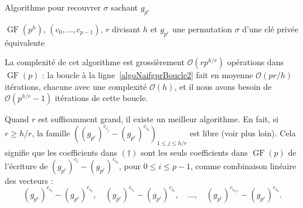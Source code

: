 \documentclass[a4paper, titlepage]{article}
\theoremstyle{definition}
\theoremstyle{remark}
\def\O{\mathcal O}
\def\gf{\operatorname{GF}}
\begin{document}
\begin{algorithm}[H]
\caption{Algorithme pour recouvrer $\sigma$ sachant $g_{p^r}$}
\label{algoNaifgpr}
\begin{algorithmic}[1]
\REQUIRE $\gf(p^h)$, $(c_0,\dots, c_{p-1})$, $r$ divisant $h$ et $g_{p^r}$
\ENSURE une permutation $\sigma$ d'une clé privée équivalente
 \label{algoNaifgprBoucle}
	 \label{algoNaifgprBoucle2}
		\ELSE
		\ENDIF
	\ENDFOR
	\RETURN{$\sigma$}
\ENDFOR
\end{algorithmic}
\end{algorithm}

La complexité de cet algorithme est grossièrement $\O(rp^{h/r})$ opérations dans $\gf(p)$ : la boucle à la ligne~\ref{algoNaifgprBoucle2} fait en moyenne $\O(pr/h)$ itérations, chacune avec une complexité $\O(h)$, et il nous avons besoin de $\O(p^{h/r}-1)$ itérations de cette boucle.

Quand $r$ est suffisamment grand, il existe un meilleur algorithme. En fait, si $r \geqslant h/r$, la famille $\left((g_{p^r})^{c_{i_j}} - (g_{p^r})^{c_{i_0}} \right)_{1\leqslant j \leqslant h/r}$ est libre (voir plus loin). Cela signifie que les coefficients dans $(\dagger)$ sont les seuls coefficients dans $\gf(p)$ de l'écriture de $(g_{p^r})^{c_{i}} - (g_{p^r})^{c_{i_0}}$, pour $0\leqslant i \leqslant p-1$, comme combinaison linéaire des vecteurs : $$(g_{p^r})^{c_{i_0}} - (g_{p^r})^{c_{i_0}}, \quad (g_{p^r})^{c_{i_1}} - (g_{p^r})^{c_{i_0}},\quad \dots,\quad (g_{p^r})^{c_{i_{h/r}}} - (g_{p^r})^{c_{i_0}}.$$
\end{document}
